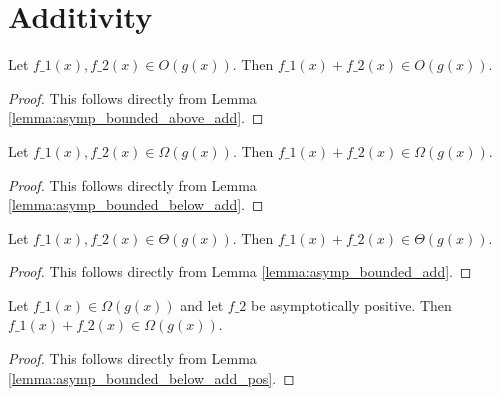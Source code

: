 \section{Additivity}

\begin{lemma}
    \label{lemma:big_o_add}
    \leanok
    Let $f\_1(x), f\_2(x) \in O(g(x))$. Then $f\_1(x) + f\_2(x) \in O(g(x))$.
\end{lemma}

\begin{proof}
    \leanok
    This follows directly from Lemma \ref{lemma:asymp_bounded_above_add}.
\end{proof}

\begin{lemma}
    \label{lemma:big_omega_add}
    \leanok
    Let $f\_1(x), f\_2(x) \in \Omega(g(x))$. Then $f\_1(x) + f\_2(x) \in \Omega(g(x))$.
\end{lemma}

\begin{proof}
    \leanok
    This follows directly from Lemma \ref{lemma:asymp_bounded_below_add}.
\end{proof}

\begin{lemma}
    \label{lemma:theta_add}
    \leanok
    Let $f\_1(x), f\_2(x) \in \Theta(g(x))$. Then $f\_1(x) + f\_2(x) \in \Theta(g(x))$.
\end{lemma}

\begin{proof}
    \leanok
    This follows directly from Lemma \ref{lemma:asymp_bounded_add}.
\end{proof}

\begin{lemma}
    \label{lemma:big_omega_add_pos}
    \leanok
    Let $f\_1(x) \in \Omega(g(x))$ and let $f\_2$ be asymptotically positive. 
    Then $f\_1(x) + f\_2(x) \in \Omega(g(x))$.
\end{lemma}

\begin{proof}
    \leanok
    This follows directly from Lemma \ref{lemma:asymp_bounded_below_add_pos}.
\end{proof}


